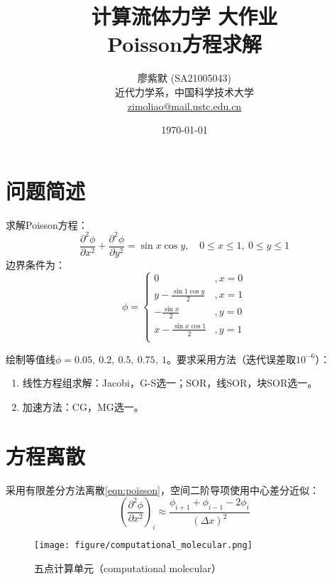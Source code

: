 \documentclass[11pt]{article}
\title{\LARGE\textbf{计算流体力学 大作业}\\\Large\textbf{Poisson方程求解}}
\author{\normalsize 廖紫默 (SA21005043)\\
\small 近代力学系，中国科学技术大学\\
\small \href{mailto:zimoliao@mail.ustc.edu.cn}{zimoliao@mail.ustc.edu.cn}}
\date{\today}
\begin{document}
\maketitle
\thispagestyle{assignment}

\setcounter{page}{1}
\section{问题简述}
求解Poisson方程：
\begin{equation}
	\frac{\partial^2\phi}{\partial x^2}+\frac{\partial^2\phi}{\partial y^2}=\sin{x}\cos{y},\quad 0\leq x\leq1,\ 0\leq y\leq1\label{eqn:poisson}
\end{equation}
边界条件为：
\begin{equation}
	\phi=\left\{\begin{array}{ll}
		0                          & ,x=0 \\
		y-\frac{\sin{1}\cos{y}}{2} & ,x=1 \\
		-\frac{\sin{x}}{2}         & ,y=0 \\
		x-\frac{\sin{x}\cos{1}}{2} & ,y=1 \\
	\end{array}\right.\label{eqn:bc}
\end{equation}

绘制等值线$\phi=0.05,\ 0.2,\ 0.5,\ 0.75,\ 1$。要求采用方法（迭代误差取$10^{-6}$）：
\begin{enumerate}
	\item 线性方程组求解：Jacobi，G-S选一；SOR，线SOR，块SOR选一。
	\item 加速方法：CG，MG选一。
\end{enumerate}

\section{方程离散}
采用有限差分方法离散\autoref{eqn:poisson}，空间二阶导项使用中心差分近似：
\begin{equation}
	\left(\frac{\partial^2\phi}{\partial x^2}\right)_i\approx\frac{\phi_{i+1}+\phi_{i-1}-2\phi_i}{\left(\Delta x\right)^2}
\end{equation}


\begin{figure}[htbp]
	\centering
	\texttt{[image: figure/computational\_molecular.png]}
	\caption{\label{fig:molecular}五点计算单元（computational molecular）\citep{ferziger_computational_2020}}
\end{figure}
\end{document}
